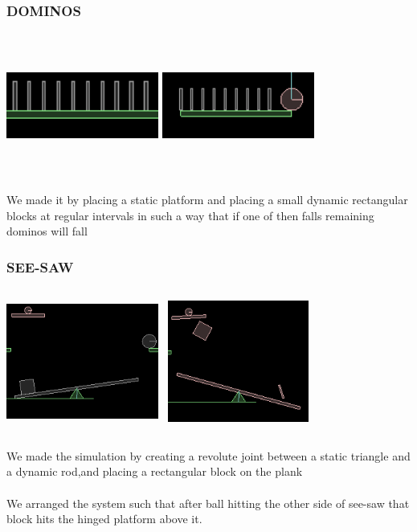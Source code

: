 \documentclass[t,compress,11pt,xcolor=dvipsnames]{beamer}
\begin{document}
\begin{frame}
\frametitle{DOMINOS}
\begin{columns}[t]
\includegraphics[width=5cm,height=4cm]{dominos}
\includegraphics[width=5cm,height=4cm]{dominos_2}
\end{columns}
We made it by placing a static platform and placing a small  dynamic rectangular blocks at regular intervals in such a way that if one of then falls remaining dominos will fall
\end{frame}
\begin{frame}
\frametitle{SEE-SAW}
\begin{columns}[t]
\includegraphics[width=5cm,height=4cm]{see-saw_1}
\includegraphics[width=5cm,height=4cm]{see-saw}
\end{columns}
We made the simulation by creating a revolute joint between a static triangle and a dynamic rod,and placing a rectangular block on the plank\\~\\
We arranged the system such that after ball hitting the other side of see-saw that block hits the hinged platform above it.
\end{frame}
\end{document}
